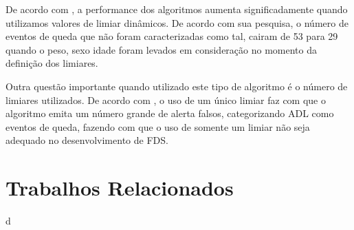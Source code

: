 De acordo com \cite{cao2012falld}, a performance dos algoritmos aumenta significadamente quando utilizamos valores de limiar dinâmicos. De acordo com sua pesquisa, o número de eventos de queda que não foram caracterizadas como tal, cairam de 53 para 29 quando o peso, sexo idade foram levados em consideração no momento da definição dos limiares.

Outra questão importante quando utilizado este tipo de algoritmo é o número de limiares utilizados. De acordo com \cite{casilari2015analysis}, o uso de um único limiar faz com que o algoritmo emita um número grande de alerta falsos, categorizando \ac{ADL} como eventos de queda, fazendo com que o uso de somente um limiar não seja adequado no desenvolvimento de \ac{FDS}.
\section{Trabalhos Relacionados}
\label{sec:FDS_examples}
d

